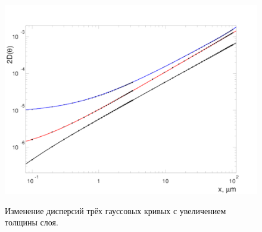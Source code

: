 \documentclass[a4paper,12pt]{article}
\begin{document}
\begin{large}
  \begin{figure}[ht]
    {
       \includegraphics[width=0.99\linewidth]{images/pars246}
    }
    \caption{Изменение дисперсий трёх гауссовых кривых с увеличением толщины слоя.}
    \label{fig:DispTheta}
  \end{figure}
  

\end{large}
\end{document}
